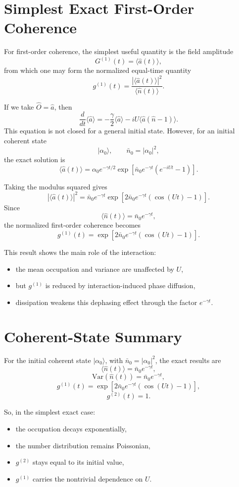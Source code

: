 \documentclass[12pt]{article}
\begin{document}
\section*{Simplest Exact First-Order Coherence}
For first-order coherence, the simplest useful quantity is the field amplitude
\[
G^{(1)}(t)=\langle \hat a(t)\rangle,
\]
from which one may form the normalized equal-time quantity
\[
g^{(1)}(t)=\frac{|\langle \hat a(t)\rangle|^2}{\langle \hat n(t)\rangle}.
\]

If we take $\hat O=\hat a$, then
\[
\frac{d}{dt}\langle \hat a\rangle
= -\frac{\gamma}{2}\langle \hat a\rangle
- iU\langle \hat a(\hat n-1)\rangle.
\]
This equation is not closed for a general initial state. However, for an initial coherent state
\[
|\alpha_0\rangle,
\qquad
\bar n_0 = |\alpha_0|^2,
\]
the exact solution is
\[
\boxed{
\langle \hat a(t)\rangle
= \alpha_0 e^{-\gamma t/2}
\exp\!\left[
\bar n_0 e^{-\gamma t}\left(e^{-iUt}-1\right)
\right].
}
\]

Taking the modulus squared gives
\[
|\langle \hat a(t)\rangle|^2
= \bar n_0 e^{-\gamma t}
\exp\!\left[
2\bar n_0 e^{-\gamma t}\left(\cos(Ut)-1\right)
\right].
\]
Since
\[
\langle \hat n(t)\rangle = \bar n_0 e^{-\gamma t},
\]
the normalized first-order coherence becomes
\[
\boxed{
g^{(1)}(t)
= \exp\!\left[
2\bar n_0 e^{-\gamma t}\left(\cos(Ut)-1\right)
\right].
}
\]

This result shows the main role of the interaction:
\begin{itemize}
\item the mean occupation and variance are unaffected by $U$,
\item but $g^{(1)}$ is reduced by interaction-induced phase diffusion,
\item dissipation weakens this dephasing effect through the factor $e^{-\gamma t}$.
\end{itemize}

\section*{Coherent-State Summary}
For the initial coherent state $|\alpha_0\rangle$, with $\bar n_0=|\alpha_0|^2$, the exact results are
\[
\boxed{
\langle \hat n(t)\rangle = \bar n_0 e^{-\gamma t},
}
\]
\[
\boxed{
\mathrm{Var}(\hat n(t)) = \bar n_0 e^{-\gamma t},
}
\]
\[
\boxed{
g^{(1)}(t)
= \exp\!\left[
2\bar n_0 e^{-\gamma t}\left(\cos(Ut)-1\right)
\right],
}
\]
\[
\boxed{
g^{(2)}(t)=1.
}
\]

So, in the simplest exact case:
\begin{itemize}
\item the occupation decays exponentially,
\item the number distribution remains Poissonian,
\item $g^{(2)}$ stays equal to its initial value,
\item $g^{(1)}$ carries the nontrivial dependence on $U$.
\end{itemize}
\end{document}

